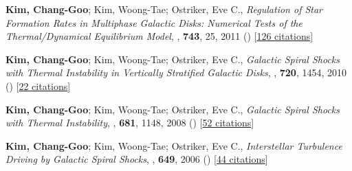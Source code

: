 \item[{4.}]\textbf{Kim, Chang-Goo}; Kim, Woong-Tae; Ostriker, Eve C., \textit{Regulation of Star Formation Rates in Multiphase Galactic Disks: Numerical Tests of the Thermal/Dynamical Equilibrium Model}, , \textbf{743}, 25, 2011 () [\href{http://adsabs.harvard.edu/abs/2011ApJ...743...25K}{126 citations}]

\item[{3.}]\textbf{Kim, Chang-Goo}; Kim, Woong-Tae; Ostriker, Eve C., \textit{Galactic Spiral Shocks with Thermal Instability in Vertically Stratified Galactic Disks}, , \textbf{720}, 1454, 2010 () [\href{http://adsabs.harvard.edu/abs/2010ApJ...720.1454K}{22 citations}]

\item[{2.}]\textbf{Kim, Chang-Goo}; Kim, Woong-Tae; Ostriker, Eve C., \textit{Galactic Spiral Shocks with Thermal Instability}, , \textbf{681}, 1148, 2008 () [\href{http://adsabs.harvard.edu/abs/2008ApJ...681.1148K}{52 citations}]

\item[{1.}]\textbf{Kim, Chang-Goo}; Kim, Woong-Tae; Ostriker, Eve C., \textit{Interstellar Turbulence Driving by Galactic Spiral Shocks}, , \textbf{649}, 2006 () [\href{http://adsabs.harvard.edu/abs/2006ApJ...649L..13K}{44 citations}]